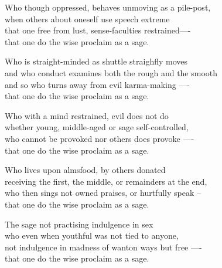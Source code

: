 \begin{MyDescription}{}
Who though oppressed, behaves unmoving as a pile-post,\\
when others about oneself use speech extreme\\
that one free from lust, sense-faculties restrained—-\\
that one do the wise proclaim as a sage.
\end{MyDescription}

\begin{MyDescription}{}
Who is straight-minded as shuttle straighﬂy moves\\
and who conduct examines both the rough and the smooth\\
and so who turns away from evil karma-making —-\\
that one do the wise proclaim as a sage.
\end{MyDescription}

\begin{MyDescription}{}
Who with a mind restrained, evil does not do\\
whether young, middle-aged or sage self-controlled,\\
who cannot be provoked nor others does provoke —-\\
that one do the wise proclaim as a sage.
\end{MyDescription}

\begin{MyDescription}{}
Who lives upon almsfood, by others donated\\
receiving the ﬁrst, the middle, or remainders at the end,\\
who then sings not owned praises, or hurtfully speak --\\
that one do the wise proclaim as a sage.
\end{MyDescription}

\begin{MyDescription}{}
The sage not practising indulgence in sex\\
who even when youthful was not tied to anyone,\\
not indulgence in madness of wanton ways but free —-\\
that one do the wise proclaim as a sage.
\end{MyDescription}

